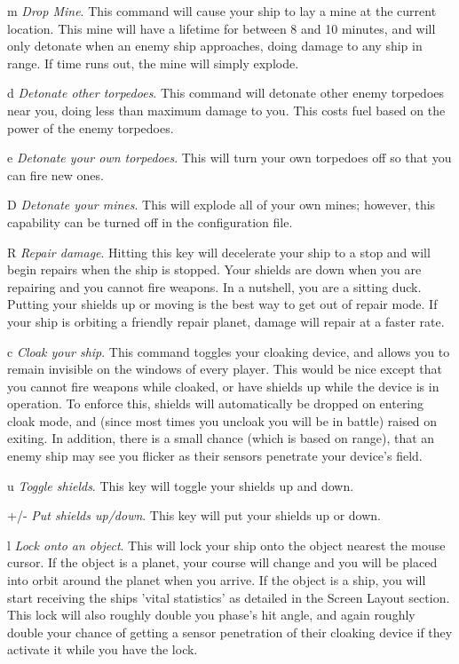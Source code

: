 \begin{list}{}{
	\renewcommand{\makelabel}[1]{{\tt #1 \hfill}}
         \setlength{\leftmargin}{.5in}
         \setlength{\labelwidth}{\leftmargin}
         \setlength{\labelsep}{0in}
}
\item[m]{\em Drop Mine}.
This command will cause your ship to lay a mine at the current location.
This mine will have a lifetime for between 8 and 10 minutes, and will only
detonate when an enemy ship approaches, doing damage to any ship in range.
If time runs out, the mine will simply explode.

\item[d]{\em Detonate other torpedoes}.
This command will detonate other enemy torpedoes near you, doing less
than maximum damage to you. This costs fuel based on the power of
the enemy torpedoes.

\item[e]{\em Detonate your own torpedoes}.
This will turn your own torpedoes off so that you can fire new ones.

\item[D]{\em Detonate your mines}.
This will explode all of your own mines; however, this capability can be 
turned off in the configuration file.

\item[R]{\em Repair damage}.
Hitting this key will decelerate your ship to a stop and will begin
repairs when the ship is stopped.  Your shields are down when you are
repairing and you cannot fire weapons.  In a nutshell, you are a
sitting duck.  Putting your shields up or moving is the best way to get
out of repair mode.  If your ship is orbiting a friendly repair planet,
damage will repair at a faster rate.

\item[c]{\em Cloak your ship}.
This command toggles your cloaking device, and allows you to remain 
invisible on the windows of every player.  This would be nice except that you cannot
fire weapons while cloaked, or have shields up while the device is in operation.
To enforce this, shields will automatically be dropped on entering cloak mode, and
(since most times you uncloak you will be in battle) raised on exiting.
In addition, there is a small chance (which is based on range), that an enemy ship
may see you flicker as their sensors penetrate your device's field.

\item[u]{\em Toggle shields}.
This key will toggle your shields up and down.

\item[+/-]{\em Put shields up/down}.
This key will put your shields up or down.

\item[l]{\em Lock onto an object}.
This will lock your ship onto the object nearest the mouse cursor. If the object
is a planet, your course will change and you will be placed into orbit around
the planet when you arrive. If the object is a ship, you will start receiving
the ships 'vital statistics' as detailed in the {\bold Screen Layout} section.
This lock will also roughly double you phase's hit angle, and again roughly
double your chance of getting a sensor penetration of their cloaking device
if they activate it while you have the lock.


\end{list}
